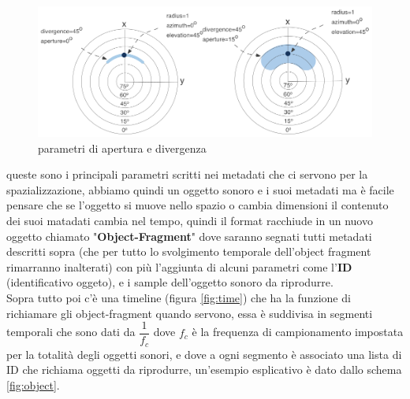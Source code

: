 \documentclass[12pt,a4paper]{report}
\begin{document}
\begin{itemize}
	\begin{figure}[htbp]
	\centering
	\includegraphics[scale=0.35]{figures/apertura.png}
	\caption {parametri di apertura e divergenza} 
	\label{fig:apertura}
	\end{figure}
	
	
\end{itemize}

queste sono i principali parametri scritti nei metadati che ci servono per la spazializzazione, abbiamo quindi un  oggetto sonoro e i suoi metadati ma è facile pensare che se l'oggetto si muove nello spazio o cambia dimensioni il contenuto dei suoi matadati cambia nel tempo, quindi il format racchiude in un nuovo oggetto chiamato "\textbf{Object-Fragment}" dove saranno segnati tutti metadati descritti sopra (che per tutto lo svolgimento temporale dell'object fragment rimarranno inalterati) con più l'aggiunta di alcuni parametri come l'\textbf{ID} (identificativo oggeto), e i sample dell'oggetto sonoro da riprodurre.\\

Sopra tutto poi c'è una timeline (figura \ref{fig:time}) che ha la funzione di richiamare gli object-fragment quando servono, essa è suddivisa in segmenti temporali che sono dati da $\dfrac{1}{f_c}$ dove $f_c$ è la frequenza di campionamento impostata per la totalità degli oggetti sonori, e dove a ogni segmento è associato una lista di ID che richiama oggetti da riprodurre, un'esempio esplicativo è dato dallo schema \ref{fig:object}.\\
\end{document}
